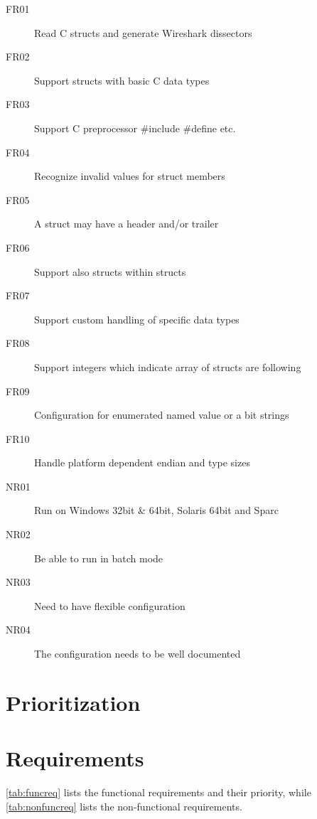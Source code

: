 \begin{description}
    \item[FR01] Read C structs and generate Wireshark dissectors
	\item[FR02] Support structs with basic C data types
	\item[FR03] Support C preprocessor \#include \#define etc.
	\item[FR04] Recognize invalid values for struct members
	\item[FR05] A struct may have a header and/or trailer
	\item[FR06] Support also structs within structs
	\item[FR07] Support custom handling of specific data types
	\item[FR08] Support integers which indicate array of structs are following
	\item[FR09] Configuration for enumerated named value or a bit strings
	\item[FR10] Handle platform dependent endian and type sizes
	\item[NR01] Run on Windows 32bit \& 64bit, Solaris 64bit and Sparc
	\item[NR02] Be able to run in batch mode
	\item[NR03] Need to have flexible configuration
	\item[NR04] The configuration needs to be well documented
\end{description}

\chapter{Prioritization}

\chapter{Requirements}
\label{chap:requirements}
\autoref{tab:funcreq} lists the functional requirements and their priority,
while \autoref{tab:nonfuncreq} lists the non-functional requirements.

